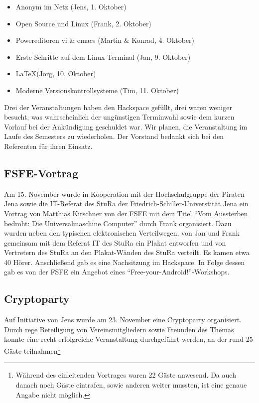 \documentclass[10pt,DIV16]{scrartcl}
\begin{document}
\begin{itemize}
	\item Anonym im Netz (Jens, 1. Oktober)
	\item Open Source und Linux (Frank, 2. Oktober)
	\item Powereditoren vi \& emacs (Martin \& Konrad, 4. Oktober)
	\item Erste Schritte auf dem Linux-Terminal (Jan, 9. Oktober)
	\item \LaTeX (Jörg, 10. Oktober)
	\item Moderne Versionskontrollsysteme (Tim, 11. Oktober)
\end{itemize}

Drei der Veranstaltungen haben den Hackspace gefüllt, drei waren weniger
besucht, was wahrscheinlich der ungünstigen Terminwahl sowie dem kurzen
Vorlauf bei der Ankündigung geschuldet war.  Wir planen, die Veranstaltung im
Laufe des Semesters zu wiederholen.  Der Vorstand bedankt sich bei den
Referenten für ihren Einsatz.

\subsection{FSFE-Vortrag}

Am 15. November wurde in Kooperation mit der Hochschulgruppe der
Piraten Jena sowie die IT-Referat des StuRa der
Friedrich-Schiller-Universtität Jena ein Vortrag von Matthias
Kirschner von der FSFE mit dem Titel "`Vom Aussterben bedroht: Die
Universalmaschine Computer"' durch Frank organisiert.  Dazu wurden
neben den typischen elektronischen Verteilwegen, von Jan und Frank
gemeinsam mit dem Referat IT des StuRa ein Plakat entworfen und von
Vertretern des StuRa an den Plakat-Wänden des StuRa verteilt. Es
kamen etwa 40 Hörer. Anschließend gab es eine Nachsitzung im
Hackspace. In Folge dessen gab es von der FSFE ein Angebot eines
"`Free-your-Android!"'-Workshops.

\subsection{Cryptoparty}

Auf Initiative von Jens wurde am 23. November eine Cryptoparty organisiert.
Durch rege Beteiligung von Vereinsmitgliedern sowie Freunden des Themas konnte
eine recht erfolgreiche Veranstaltung durchgeführt werden, an der rund 25
Gäste teilnahmen\footnote{Während des einleitenden Vortrages waren 22 Gäste
anwesend. Da auch danach noch Gäste eintrafen, sowie anderen weiter mussten,
ist eine genaue Angabe nicht möglich.}
\end{document}

